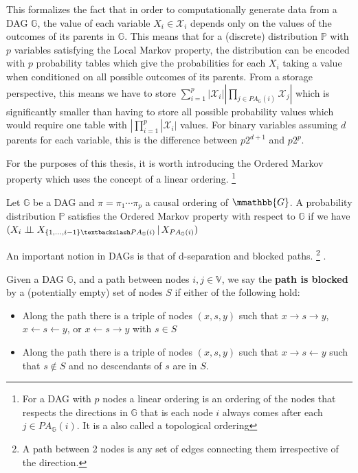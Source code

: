 \documentclass{tufte-book}
\begin{document}
This formalizes the fact that in order to computationally generate data from a DAG \(\mathbb{G}\), the value of each variable \(X_i \in \mathcal{X}_i\) depends only on the values of the outcomes of its parents in \(\mathbb{G}\). This means that for a (discrete) distribution \(\mathbb{P}\) with \(p\) variables satisfying the Local Markov property, the distribution can be encoded with \(p\) probability tables which give the probabilities for each \(X_i\) taking a value when conditioned on all possible outcomes of its parents. From a storage perspective, this means we have to store \(\sum_{i=1}^p |\mathcal{X}_i| |\prod_{j \in PA_{\mathbb{G}}(i)}\mathcal{X}_j |\) which is significantly smaller than having to store all possible probability values which would require one table with \(|\prod_{i=1}^p |\mathcal{X}_i|\) values. For binary variables assuming \(d\) parents for each variable, this is the difference between \(p2^{d+1}\) and \(p2^p\).


For the purposes of this thesis, it is worth introducing the Ordered Markov property which uses the concept of a linear ordering.  \footnote{For a DAG  with $p$ nodes a linear ordering is an ordering of the nodes that respects the directions in $\mathbb{G}$ that is each node $i$ always comes after each $j \in PA_{\mathbb{G}}(i)$. It is a also called a topological ordering} 

\begin{theorem}\label{orderedmarkov}
Let $\mathbb{G}$ be a DAG and $\pi = \pi_1 \cdots \pi_p$ a causal ordering of $\mmathbb{G}$. A probability distribution $\mathbb{P}$ satisfies the Ordered Markov property with respect to $\mathbb{G}$ if we have $(X_i \indep X_{\{1,...,i-1 \} \textbackslash PA_{\mathbb{G}}(i)}\,|\, X_{PA_{\mathbb{G}}(i)})$ 
\end{theorem}


An important notion in DAGs is that of d-separation and blocked paths.
  \footnote{\baselineskip \baselineskip A path between 2 nodes is any set of edges connecting them irrespective of the direction.} .


\begin{definition}\label{bpath}

Given a DAG $\mathbb{G}$, and a path between nodes $i,j \in \mathbb{V}$, we say the \textbf{path is blocked} by a (potentially empty) set of nodes $S$ if either of the following hold:
\begin{itemize}
\item Along the path there is a triple of nodes $(x,s,y)$ such that $x \rightarrow s \rightarrow y$, $x \leftarrow s \leftarrow y$, or $x \leftarrow s \rightarrow y$ with $s \in S$
\item Along the path there is a triple of nodes $(x,s,y)$ such that $x \rightarrow s \leftarrow y$ such that $s \notin S$ and no descendants of $s$ are in $S$.
\end{itemize}

\end{definition}
\end{document}
